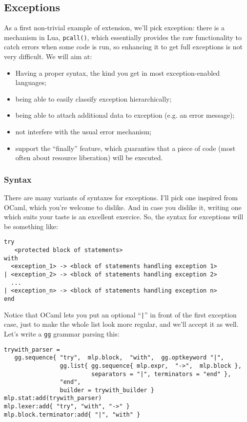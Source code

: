 \subsection{Exceptions}
As a first non-trivial example of extension, we'll pick exception:
there is a mechanism in Lua, {\tt pcall()}, which essentially provides
the raw functionality to catch errors when some code is run, so
enhancing it to get full exceptions is not very difficult. We will aim
at:
\begin{itemize}
\item Having a proper syntax, the kind you get in most
  exception-enabled languages;
\item being able to easily classify exception hierarchically;
\item being able to attach additional data to exception (e.g. an error
  message);
\item not interfere with the usual error mechanism;
\item support the ``finally'' feature, which guaranties that a piece
  of code (most often about resource liberation) will be executed.
\end{itemize}

\subsubsection{Syntax}
There are many variants of syntaxes for exceptions. I'll pick one
inspired from OCaml, which you're welcome to dislike. And in case you
dislike it, writing one which suits your taste is an excellent
exercice. So, the syntax for exceptions will be something like:
\begin{verbatim}
try
   <protected block of statements>
with
  <exception_1> -> <block of statements handling exception 1>
| <exception_2> -> <block of statements handling exception 2>
  ...
| <exception_n> -> <block of statements handling exception n>
end
\end{verbatim}

Notice that OCaml lets you put an optional ``{\tt|}'' in front of the
first exception case, just to make the whole list look more regular,
and we'll accept it as well. Let's write a {\tt gg} grammar parsing
this:

\begin{verbatim}
trywith_parser = 
   gg.sequence{ "try",  mlp.block,  "with",  gg.optkeyword "|",
                gg.list{ gg.sequence{ mlp.expr,  "->",  mlp.block },
                         separators = "|", terminators = "end" },
                "end", 
                builder = trywith_builder }
mlp.stat:add(trywith_parser)
mlp.lexer:add{ "try", "with", "->" }
mlp.block.terminator:add{ "|", "with" }
\end{verbatim}

